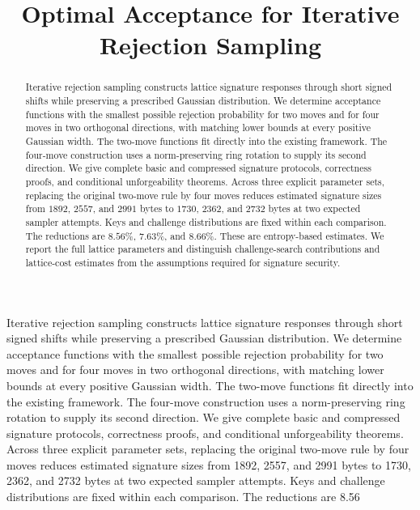 \documentclass{iacrcc}
\title[running={Optimal Acceptance for Iterative Rejection Sampling}]{Optimal Acceptance for Iterative Rejection Sampling}
\begin{document}
\maketitle

\begin{abstract}
Iterative rejection sampling constructs lattice signature responses through short signed shifts while preserving a prescribed Gaussian distribution. We determine acceptance functions with the smallest possible rejection probability for two moves and for four moves in two orthogonal directions, with matching lower bounds at every positive Gaussian width. The two-move functions fit directly into the existing framework. The four-move construction uses a norm-preserving ring rotation to supply its second direction. We give complete basic and compressed signature protocols, correctness proofs, and conditional unforgeability theorems. Across three explicit parameter sets, replacing the original two-move rule by four moves reduces estimated signature sizes from $1892$, $2557$, and $2991$ bytes to $1730$, $2362$, and $2732$ bytes at two expected sampler attempts. Keys and challenge distributions are fixed within each comparison. The reductions are $8.56\%$, $7.63\%$, and $8.66\%$. These are entropy-based estimates. We report the full lattice parameters and distinguish challenge-search contributions and lattice-cost estimates from the assumptions required for signature security.
\end{abstract}

\begin{textabstract}
Iterative rejection sampling constructs lattice signature responses through short signed shifts while preserving a prescribed Gaussian distribution. We determine acceptance functions with the smallest possible rejection probability for two moves and for four moves in two orthogonal directions, with matching lower bounds at every positive Gaussian width. The two-move functions fit directly into the existing framework. The four-move construction uses a norm-preserving ring rotation to supply its second direction. We give complete basic and compressed signature protocols, correctness proofs, and conditional unforgeability theorems. Across three explicit parameter sets, replacing the original two-move rule by four moves reduces estimated signature sizes from 1892, 2557, and 2991 bytes to 1730, 2362, and 2732 bytes at two expected sampler attempts. Keys and challenge distributions are fixed within each comparison. The reductions are 8.56%
\end{textabstract}






\FloatBarrier

\FloatBarrier

\FloatBarrier


\clearpage
\appendix




\FloatBarrier

\end{document}
